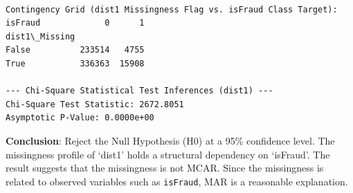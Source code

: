 \documentclass[11pt]{article}
\begin{document}
    \begin{Verbatim}[commandchars=\\\{\}]

Contingency Grid (dist1 Missingness Flag vs. isFraud Class Target):
isFraud             0      1
dist1\_Missing
False          233514   4755
True           336363  15908

--- Chi-Square Statistical Test Inferences (dist1) ---
Chi-Square Test Statistic: 2672.8051
Asymptotic P-Value: 0.0000e+00
    \end{Verbatim}

    \textbf{Conclusion}: Reject the Null Hypothesis (H0) at a 95\%
confidence level. The missingness profile of `dist1' holds a structural
dependency on `isFraud'. The result suggests that the missingness is not
MCAR. Since the missingness is related to observed variables such as
\texttt{isFraud}, MAR is a reasonable explanation.
\end{document}
